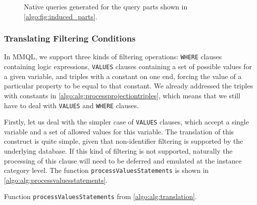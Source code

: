 \begin{figure}[ht]
\caption{Native queries generated for the query parts shown in \cref{algo:fig:induced_parts}.}\label{algo:fig:induced_native}
\end{figure}

\subsubsection{Translating Filtering Conditions}

In MMQL, we support three kinds of filtering operations: \texttt{WHERE} clauses containing logic expressions, \texttt{VALUES} clauses containing a set of possible values for a given variable, and triples with a constant on one end, forcing the value of a particular property to be equal to that constant.
We already addressed the triples with constants in \cref{algo:alg:processprojectiontriples}, which means that we still have to deal with \texttt{VALUES} and \texttt{WHERE} clauses.

Firstly, let us deal with the simpler case of \texttt{VALUES} clauses, which accept a single variable and a set of allowed values for this variable.
The translation of this construct is quite simple, given that non-identifier filtering is supported by the underlying database.
If this kind of filtering is not supported, naturally the processing of this clause will need to be deferred and emulated at the instance category level.
The function \texttt{processValuesStatements} is shown in \cref{algo:alg:processvaluesstatements}.

\begin{algorithm}[ht]
\small
\DontPrintSemicolon
{}


\caption{Function \texttt{processValuesStatements} from \cref{algo:alg:translation}.}
\label{algo:alg:processvaluesstatements}
\end{algorithm}

